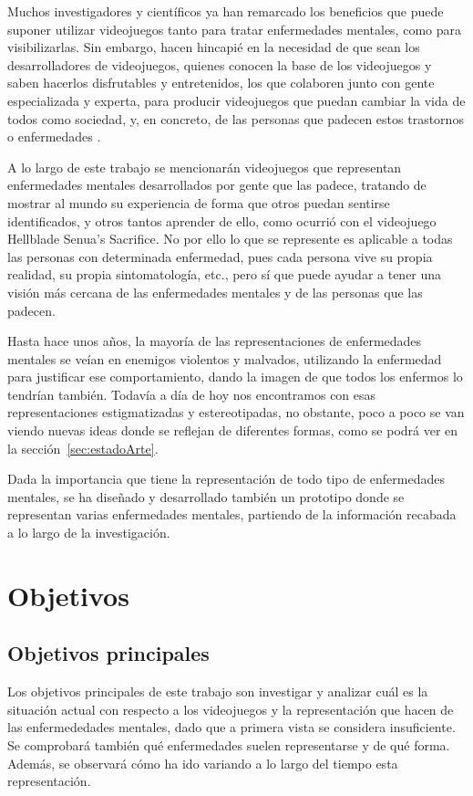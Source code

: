 \documentclass[12pt, a4paper,twoside,titlepage]{book}
\begin{document}
Muchos investigadores y científicos ya han remarcado los beneficios que puede suponer utilizar videojuegos tanto para tratar enfermedades mentales, como para visibilizarlas. Sin embargo, hacen hincapié en la necesidad de que sean los desarrolladores de videojuegos, quienes conocen la base de los videojuegos y saben hacerlos disfrutables y entretenidos, los que colaboren junto con gente especializada y experta, para producir videojuegos que puedan cambiar la vida de todos como sociedad, y, en concreto, de las personas que padecen estos trastornos o enfermedades \cite{articuloDesarrolloCient}.

A lo largo de este trabajo se mencionarán videojuegos que representan enfermedades mentales desarrollados por gente que las padece, tratando de mostrar al mundo su experiencia de forma que otros puedan sentirse identificados, y otros tantos aprender de ello, como ocurrió con el videojuego Hellblade Senua's Sacrifice. No por ello lo que se represente es aplicable a todas las personas con determinada enfermedad, pues cada persona vive su propia realidad, su propia sintomatología, etc., pero sí que puede ayudar a tener una visión más cercana de las enfermedades mentales y de las personas que las padecen. 

Hasta hace unos años, la mayoría de las representaciones de enfermedades mentales se veían en enemigos violentos y malvados, utilizando la enfermedad para justificar ese comportamiento, dando la imagen de que todos los enfermos lo tendrían también. Todavía a día de hoy nos encontramos con esas representaciones estigmatizadas y estereotipadas, no obstante, poco a poco se van viendo nuevas ideas donde se reflejan de diferentes formas, como se podrá ver en la sección~\ref{sec:estadoArte}. 

Dada la importancia que tiene la representación de todo tipo de enfermedades mentales, se ha diseñado y desarrollado también un prototipo donde se representan varias enfermedades mentales, partiendo de la información recabada a lo largo de la investigación.

\chapter{Objetivos}


\section{Objetivos principales}

    Los objetivos principales de este trabajo son investigar y analizar cuál es la situación actual con respecto a los videojuegos y la representación que hacen de las enfermededades mentales, dado que a primera vista se considera insuficiente. Se comprobará también qué enfermedades suelen representarse y de qué forma. Además, se observará cómo ha ido variando a lo largo del tiempo esta representación.
    
\end{document}
